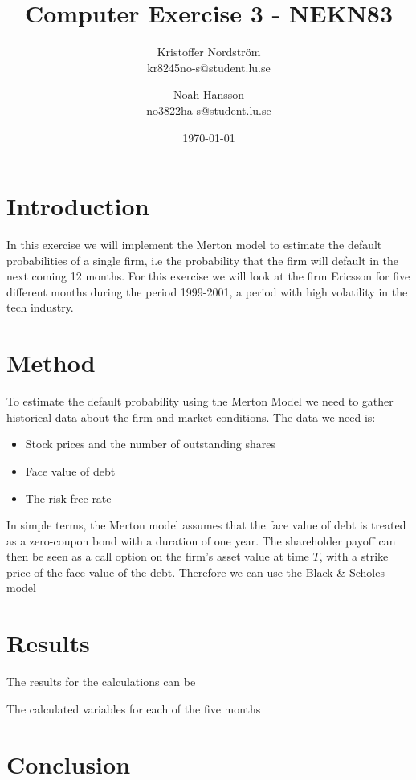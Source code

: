 \documentclass[a4paper]{article}
\title{Computer Exercise 3 - NEKN83}
\author{Kristoffer Nordström \\ kr8245no-s@student.lu.se \and  Noah Hansson \\ no3822ha-s@student.lu.se}
\date{\today}
\begin{document}
\maketitle

\section{Introduction}
In this exercise we will implement the Merton model to estimate the default probabilities of a single firm, i.e the probability that the firm will default in the next coming 12 months. For this exercise we will look at the firm Ericsson for five different months during the period 1999-2001, a period with high volatility in the tech industry.

\section{Method}
To estimate the default probability using the Merton Model we need to gather historical data about the firm and market conditions. The data we need is:
\begin{itemize}
    \item Stock prices and the number of outstanding shares
    \item Face value of debt
    \item The risk-free rate
\end{itemize}

In simple terms, the Merton model assumes that the face value of debt is treated as a zero-coupon bond with a duration of one year. The shareholder payoff can then be seen as a call option on the firm's asset value at time $T$, with a strike price of the face value of the debt. Therefore we can use the Black \& Scholes model

\section{Results}

The results for the calculations can be 
\begin{table}[H]
    \centering
    \caption{The calculated variables for each of the five months}
    \label{tab:result}
    
\end{table}

\section{Conclusion}
\end{document}
